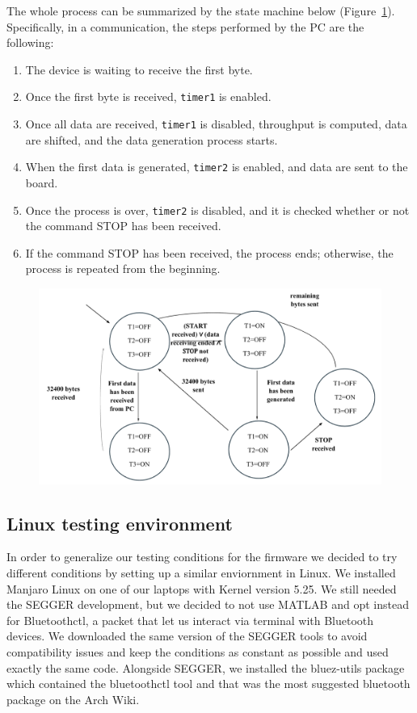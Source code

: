 \documentclass{Configuration_Files/PoliMi3i_thesis}
\begin{document}
The whole process can be summarized by the state machine below (Figure~\ref{fig:state_machine}). Specifically, in a communication, the steps performed by the PC are the following:

\begin{enumerate}
    \item The device is waiting to receive the first byte.
    \item Once the first byte is received, \texttt{timer1} is enabled.
    \item Once all data are received, \texttt{timer1} is disabled, throughput is computed, data are shifted, and the data generation process starts.
    \item When the first data is generated, \texttt{timer2} is enabled, and data are sent to the board.
    \item Once the process is over, \texttt{timer2} is disabled, and it is checked whether or not the command STOP has been received.
    \item If the command STOP has been received, the process ends; otherwise, the process is repeated from the beginning.
\end{enumerate}

\begin{figure}[H]
\centering
\includegraphics[scale=0.7]{Board_Windows_PC/10.png}
\label{fig:state_machine}
\end{figure}

\subsection{Linux testing environment}

In order to generalize our testing conditions for the firmware we decided to try different conditions by setting up a similar enviornment in Linux.
We installed Manjaro Linux on one of our laptops with Kernel version 5.25.
We still needed the SEGGER development, but we decided to not use MATLAB and opt instead for Bluetoothctl, a packet that let us interact via terminal with Bluetooth devices.
We downloaded the same version of the SEGGER tools to avoid compatibility issues and keep the conditions as constant as possible and used exactly the same code.
Alongside SEGGER, we installed the bluez-utils package which contained the bluetoothctl tool and that was the most suggested bluetooth package on the Arch Wiki.
\end{document}
